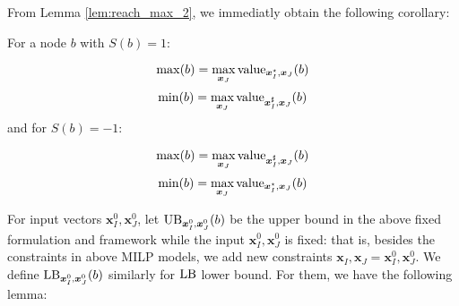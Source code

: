 			From Lemma \ref{lem:reach_max_2}, we immediatly obtain the following corollary:

			\begin{corollary}
				\label{corr:main}
			For a node $b$ with $S(b)=1$:
		
			$$\max(b)=\max_{\boldsymbol{x}_J} {\textrm{value}}_{\boldsymbol{x}^{\star}_I,\boldsymbol{x}_J}(b)$$
			$$\min(b)=\max_{\boldsymbol{x}_J} {\textrm{value}}_{\boldsymbol{x}^{\sharp}_I,\boldsymbol{x}_J}(b)$$
			and for $S(b)=-1$:
	
			$$\max(b)=\max_{\boldsymbol{x}_J} {\textrm{value}}_{\boldsymbol{x}^{\sharp}_I,\boldsymbol{x}_J}(b)$$
			$$\min(b)=\max_{\boldsymbol{x}_J} {\textrm{value}}_{\boldsymbol{x}^{\star}_I,\boldsymbol{x}_J}(b)$$
			\end{corollary}
			
	
			


			
			





			
			
			
			
			
\iffalse			
			For input vectors $\boldsymbol{x}^0_I,\boldsymbol{x}^0_J$, let $\mathrm{UB}_{\boldsymbol{x}^0_I,\boldsymbol{x}^0_J}(b)$ be the upper bound in the above fixed formulation and framework while the input $\boldsymbol{x}^0_I,\boldsymbol{x}^0_J$ is fixed: that is, besides the constraints in above MILP models, we add new constraints $\boldsymbol{x}_I,\boldsymbol{x}_J=\boldsymbol{x}^0_I,\boldsymbol{x}^0_J$. We  define $\mathrm{LB}_{\boldsymbol{x}^0_I,\boldsymbol{x}^0_J}(b)$ similarly for $\mathrm{LB}$ lower bound. For them, we have the following lemma:
			
